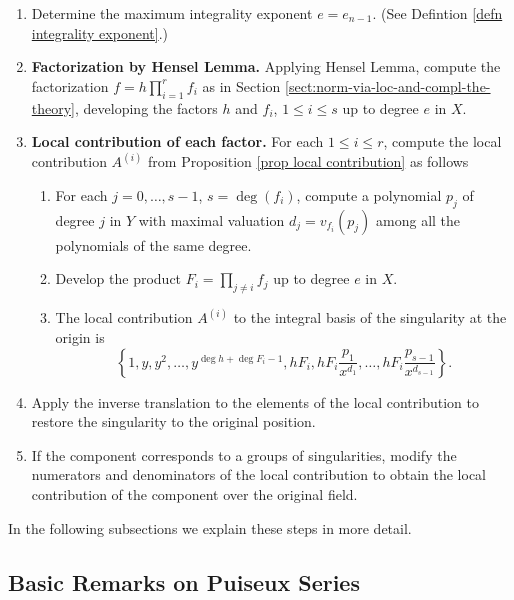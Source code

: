 \documentclass[a4paper,11pt]{amsart}%
\theoremstyle{definition}
\theoremstyle{plain}
\theoremstyle{remark}
\begin{document}
\begin{enumerate}[resume]
\item Determine the maximum integrality exponent $e = e_{n-1}$. (See Defintion \ref{defn integrality exponent}.)

\item \textbf{Factorization by Hensel Lemma.} Applying Hensel Lemma, compute
the factorization $f = h \prod_{i=1}^{r} f_{i}$ as in Section \ref{sect:norm-via-loc-and-compl-the-theory}, developing the factors $h$ and $f_{i}$, $1 \le i \le s$
up to degree $e$ in $X$.

\item \textbf{Local contribution of each factor.} For each $1 \le i \le r$,
compute the local contribution $A^{(i)}$ from Proposition \ref{prop local contribution}
as follows

\begin{enumerate}
\item For each $j = 0, \dots, s-1$, $s = \deg(f_{i})$, compute a polynomial
$p_{j}$ of degree $j$ in $Y$ with maximal valuation $d_j = v_{f_{i}}(p_{j})$ among
all the polynomials of the same degree.

\item Develop the product $F_{i} = \prod_{j \ne i} f_{j}$  up to degree $e$ in $X$.

\item The local contribution $A^{(i)}$ to the integral basis of the
singularity at the origin is
\[
\left\{  1, y, y^{2}, \dots, y^{\deg{h} + \deg{F_{i}} -1}, h F_{i}, h F_{i}
\frac{p_{1}}{x^{d_{1}}}, \dots, h F_{i} \frac{p_{s-1}}{x^{d_{s-1}}}\right\}
.
\]

\end{enumerate}

\item Apply the inverse translation to the elements of the local contribution
to restore the singularity to the original position.

\item If the component corresponds to a groups of singularities, modify the
numerators and denominators of the local contribution to obtain the local
contribution of the component over the original field.
\end{enumerate}

In the following subsections we explain these steps in more detail.

\subsection{Basic Remarks on Puiseux Series}
\end{document}
